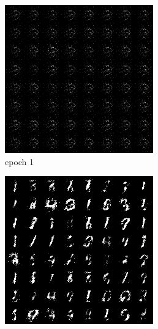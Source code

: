 \documentclass[a4paper]{article}
\theoremstyle{definition}
\newenvironment{soln}{
	\leavevmode\color{blue}\ignorespaces
}{}
\begin{document}
\begin{enumerate} [label=(\alph*)]
\begin{soln}
			\begin{figure}[H]
				\centering
				\begin{subfigure}[b]{0.3\textwidth}
					\centering
					\includegraphics[width=\textwidth]{1a_e1.png}
					\caption{epoch 1}
				\end{subfigure}
				\hfill
				\begin{subfigure}[b]{0.3\textwidth}
					\centering
					\includegraphics[width=\textwidth]{1a_e50.png}

\end{subfigure}
\end{figure}
\end{soln}
\end{enumerate}
\end{document}
